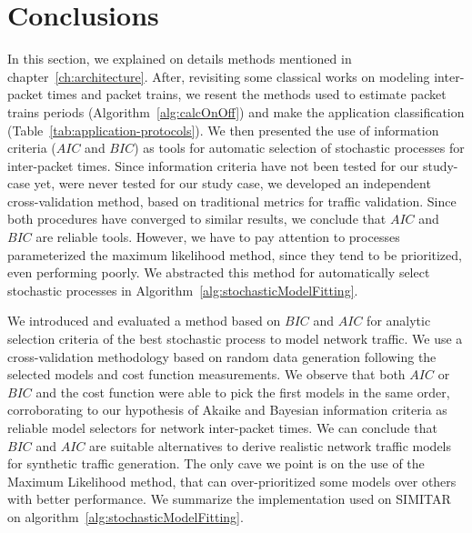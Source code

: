  




\section{Conclusions}


In this section, we explained on details methods mentioned in chapter~\ref{ch:architecture}. 
After,  revisiting some classical works on modeling inter-packet times and packet trains,  we resent the methods used to estimate packet trains periods (Algorithm~\ref{alg:calcOnOff}) and make the application classification (Table~\ref{tab:application-protocols}). We then presented the use of information criteria ($AIC$ and $BIC$) as tools for automatic selection of stochastic processes for inter-packet times. Since information criteria have not been tested for our study-case yet, were never tested for our study case, we developed an independent cross-validation method, based on traditional metrics for traffic validation. Since both procedures have converged to similar results, we conclude that $AIC$ and $BIC$ are reliable tools. However, we have to pay attention to processes parameterized the maximum likelihood method, since they tend to be prioritized, even performing poorly.  We abstracted this method for automatically select stochastic processes in Algorithm~\ref{alg:stochasticModelFitting}. 
 
 

We introduced and evaluated a method based on $BIC$ and $AIC$ for analytic selection criteria of the best stochastic process to model network traffic. We use a cross-validation methodology based on random data generation following the selected models and cost function measurements. We observe that both $AIC$ or $BIC$ and the cost function were able to pick the first models in the same order, corroborating to our hypothesis of Akaike and Bayesian information criteria as reliable model selectors for network inter-packet times. We can conclude that $BIC$ and $AIC$ are suitable alternatives to derive realistic network traffic models for synthetic traffic generation. The only cave we point is on the use of the Maximum Likelihood method, that can over-prioritized some models over others with better performance. We summarize the implementation used on SIMITAR on algorithm~\ref{alg:stochasticModelFitting}.

